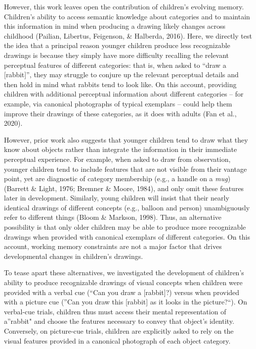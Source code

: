 \documentclass[
  english,
  man]{apa6}
\begin{document}
However, this work leaves open the contribution of children's evolving memory. Children's ability to access semantic knowledge about categories and to maintain this information in mind when producing a drawing likely changes across childhood (Pailian, Libertus, Feigenson, \& Halberda, 2016). Here, we directly test the idea that a principal reason younger children produce less recognizable drawings is because they simply have more difficulty recalling the relevant perceptual features of different categories: that is, when asked to \enquote{draw a {[}rabbit{]}}, they may struggle to conjure up the relevant perceptual details and then hold in mind what rabbits tend to look like. On this account, providing children with additional perceptual information about different categories -- for example, via canonical photographs of typical exemplars -- could help them improve their drawings of these categories, as it does with adults (Fan et al., 2020).

However, prior work also suggests that younger children tend to draw what they know about objects rather than integrate the information in their immediate perceptual experience. For example, when asked to draw from observation, younger children tend to include features that are not visible from their vantage point, yet are diagnostic of category membership (e.g., a handle on a \textit{mug}) (Barrett \& Light, 1976; Bremner \& Moore, 1984), and only omit these features later in development. Similarly, young children will insist that their nearly identical drawings of different concepts (e.g., balloon and person) unambiguously refer to different things (Bloom \& Markson, 1998).
Thus, an alternative possibility is that only older children may be able to produce more recognizable drawings when provided with canonical exemplars of different categories.
On this account, working memory constraints are not a major factor that drives developmental changes in children's drawings.

To tease apart these alternatives, we investigated the development of children's ability to produce recognizable drawings of visual concepts when children were provided with a verbal cue (\enquote{Can you draw a {[}rabbit{]}?) versus when provided with a picture cue (}Can you draw this {[}rabbit{]} as it looks in the picture?\enquote{). On verbal-cue trials, children thus must access their mental representation of a}rabbit" and choose the features necessary to convey that object's identity. Conversely, on picture-cue trials, children are explicitly asked to rely on the visual features provided in a canonical photograph of each object category.
\end{document}
